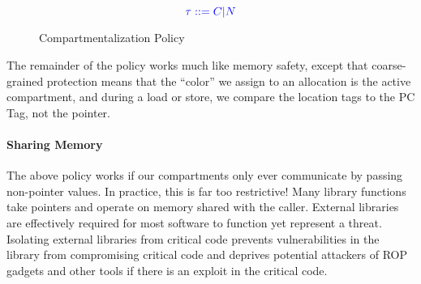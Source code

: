 \documentclass{llncs}
\begin{document}
\begin{figure}
  \begin{minipage}[t]{0.4\textwidth}
    \vspace{-3em}
    \[\color{blue} \tau ::= C | {\color{blue} N}\]

  
  \end{minipage}
  \begin{minipage}[t]{0.25\textwidth}
  \end{minipage}
  \begin{minipage}[t]{0.25\textwidth}
    
  \end{minipage}
    
  \caption{Compartmentalization Policy}
  \label{fig:compartments}
\end{figure}

The remainder of the policy works much like memory safety, except that coarse-grained
protection means that the ``color'' we assign to an allocation is the active compartment,
and during a load or store, we compare the location tags to the PC Tag, not the pointer.

\paragraph{Sharing Memory}

The above policy works if our compartments only ever communicate by passing
non-pointer values. In practice, this is far too restrictive! Many library functions 
take pointers and operate on memory shared with the caller. External libraries are
effectively required for most software to function yet represent a threat. Isolating 
external libraries from critical code prevents vulnerabilities in the library from 
compromising critical code and deprives potential attackers of ROP gadgets and other
tools if there is an exploit in the critical code.
\end{document}
